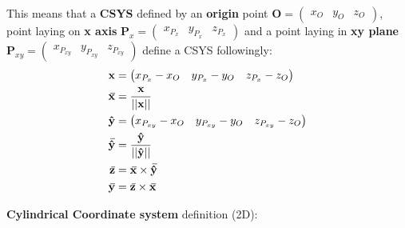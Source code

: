 \documentclass[10pt,b5paper,titlepage]{book}
\newcommand{\m}{\mathbf}
\newcommand{\closure}[2][3]{%
{}\mkern#1mu\overline{\mkern-#1mu#2}}
\newenvironment{eqarray}
{
    \begin{eqnarray}
        \begin{aligned}
}
{
        \end{aligned}
    \end{eqnarray}
}
\begin{document}
This means that a \textbf{CSYS} defined by an \textbf{origin} point
$ \m{O} = \begin{pmatrix} x_O & y_O & z_O \end{pmatrix} $,
point laying on \textbf{x axis}
$ \m{P}_x = \begin{pmatrix} x_{P_x} & y_{P_x} & z_{P_x} \end{pmatrix} $ and a
point laying in \textbf{xy plane}
$ \m{P}_{xy} = \begin{pmatrix} x_{P_{xy}} & y_{P_{xy}} & z_{P_{xy}} \end{pmatrix} $
define a CSYS followingly:
\begin{eqarray}
    \m{x} &= \begin{pmatrix} x_{P_x} - x_O & y_{P_x} - y_O & z_{P_x} - z_O \end{pmatrix} \\
    \m{\closure{x}} &= \frac{\m{x}}{||\m{x}||} \\
    \m{\hat{y}} &= \begin{pmatrix} x_{P_{xy}} - x_O & y_{P_{xy}} - y_O & z_{P_{xy}} - z_O \end{pmatrix} \\
    \m{\closure{\hat{y}}} &= \frac{\m{\hat{y}}}{||\m{\hat{y}}||} \\
    \m{\closure{z}} &= \m{\closure{x}} \times \m{\closure{\hat{y}}} \\
    \m{\closure{y}} &= \m{\closure{z}} \times \m{\closure{x}} \\
\end{eqarray}


\textbf{Cylindrical Coordinate system} definition (2D):
\end{document}
